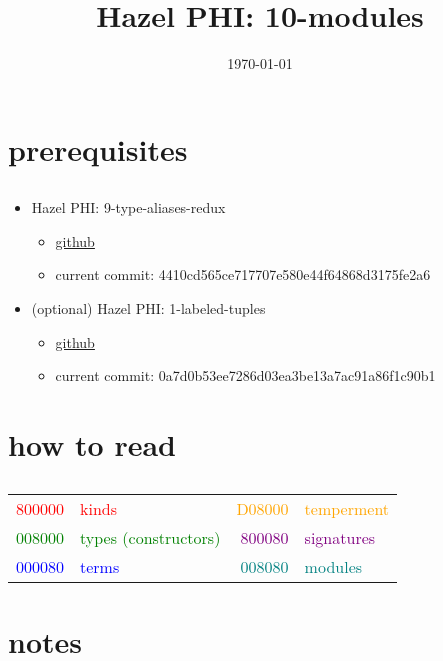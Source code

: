 \documentclass[11pt,fleqn]{article}
\newcommand{\red}[1]{\textcolor{red}{#1}}
\newcommand{\green}[1]{\textcolor{green}{#1}}
\newcommand{\blue}[1]{\textcolor{blue}{#1}}
\newcommand{\orange}[1]{\textcolor{orange}{#1}}
\newcommand{\purple}[1]{\textcolor{purple}{#1}}
\newcommand{\teal}[1]{\textcolor{teal}{#1}}
\begin{document}
\title{Hazel PHI: 10-modules}
\author{}
\date{\today}
\maketitle
\section{prerequisites}
\subsection*{}
\begin{itemize}
    \item Hazel PHI: 9-type-aliases-redux
        \begin{itemize}
            \item \href{https://github.com/hazelgrove/phi/tree/9-type-aliases-redux}{github}
            \item current commit: 4410cd565ce717707e580e44f64868d3175fe2a6
        \end{itemize}
    \item (optional) Hazel PHI: 1-labeled-tuples
        \begin{itemize}
            \item \href{https://github.com/hazelgrove/phi/tree/1-labeled-tuples}{github}
            \item current commit: 0a7d0b53ee7286d03ea3be13a7ac91a86f1c90b1
        \end{itemize}
\end{itemize}
\section{how to read}
\subsection*{}
\begin{tabular}{rlrl}
    \red{800000} & \red{kinds} & \orange{D08000} & \orange{temperment} \\
    \green{008000} & \green{types (constructors)} & \purple{800080} & \purple{signatures} \\
    \blue{000080} & \blue{terms} & \teal{008080} & \teal{modules} \\
\end{tabular}
\section{notes}
\end{document}
